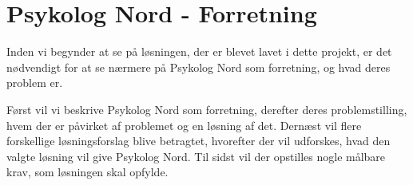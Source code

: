 \section{Psykolog Nord - Forretning}

Inden vi begynder at se på løsningen, der er blevet lavet i dette projekt, er det nødvendigt for at se nærmere på Psykolog Nord som forretning, og hvad deres problem er.

Først vil vi beskrive Psykolog Nord som forretning, derefter deres problemstilling, hvem der er påvirket af problemet og en løsning af det.
Dernæst vil flere forskellige løsningsforslag blive betragtet, hvorefter der vil udforskes, hvad den valgte løsning vil give Psykolog Nord.
Til sidst vil der opstilles nogle målbare krav, som løsningen skal opfylde.









